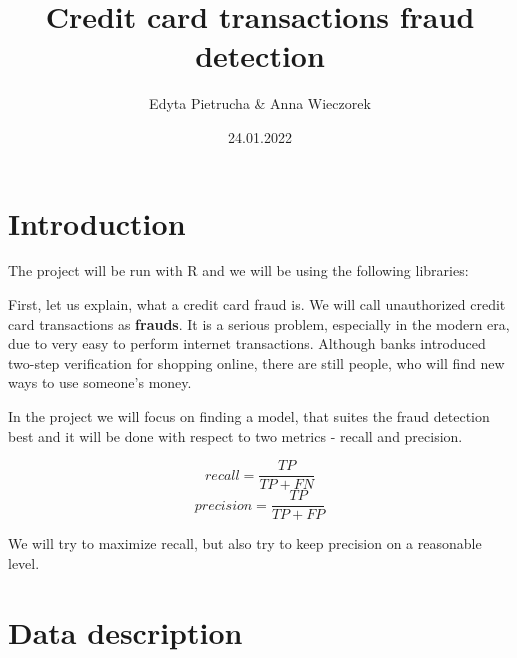 \documentclass[
]{report}
\title{Credit card transactions fraud detection}
\author{Edyta Pietrucha \& Anna Wieczorek}
\date{24.01.2022}
\newenvironment{Shaded}{\begin{snugshade}}{\end{snugshade}}
\newcommand{\FunctionTok}[1]{\textcolor[rgb]{0.00,0.00,0.00}{#1}}
\newcommand{\NormalTok}[1]{#1}
\newcommand{\OtherTok}[1]{\textcolor[rgb]{0.56,0.35,0.01}{#1}}
\newcommand{\SpecialCharTok}[1]{\textcolor[rgb]{0.00,0.00,0.00}{#1}}
\begin{document}
\maketitle

\tableofcontents

\hypertarget{introduction}{%
\chapter{Introduction}\label{introduction}}

The project will be run with R and we will be using the following
libraries:

\begin{Shaded}
\end{Shaded}

First, let us explain, what a credit card fraud is. We will call
unauthorized credit card transactions as \textbf{frauds}. It is a
serious problem, especially in the modern era, due to very easy to
perform internet transactions. Although banks introduced two-step
verification for shopping online, there are still people, who will find
new ways to use someone's money.

In the project we will focus on finding a model, that suites the fraud
detection best and it will be done with respect to two metrics - recall
and precision.

$$ recall = \frac{TP}{TP+FN}$$
$$ precision = \frac{TP}{TP+FP}$$

We will try to maximize recall, but also try to keep precision on a
reasonable level.

\hypertarget{data-description}{%
\chapter{Data description}\label{data-description}}
\end{document}
